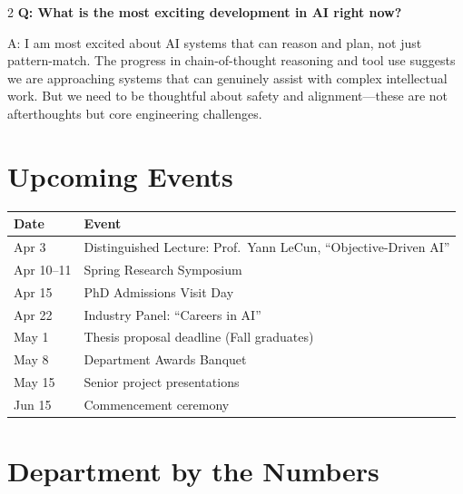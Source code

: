 \documentclass[10pt,a4paper]{article}
\begin{document}
\begin{multicols}{2}
\textbf{Q: What is the most exciting development in AI right now?}

A: I am most excited about AI systems that can reason and plan, not just pattern-match. The progress in chain-of-thought reasoning and tool use suggests we are approaching systems that can genuinely assist with complex intellectual work. But we need to be thoughtful about safety and alignment---these are not afterthoughts but core engineering challenges.

\section{Upcoming Events}

\renewcommand{\arraystretch}{1.3}
\begin{tabularx}{\columnwidth}{@{}lX@{}}
\toprule
\textbf{Date} & \textbf{Event} \\
\midrule
Apr 3 & Distinguished Lecture: Prof.\ Yann LeCun, ``Objective-Driven AI'' \\
Apr 10--11 & Spring Research Symposium \\
Apr 15 & PhD Admissions Visit Day \\
Apr 22 & Industry Panel: ``Careers in AI'' \\
May 1 & Thesis proposal deadline (Fall graduates) \\
May 8 & Department Awards Banquet \\
May 15 & Senior project presentations \\
Jun 15 & Commencement ceremony \\
\bottomrule
\end{tabularx}

\section{Department by the Numbers}

\begin{center}
\end{center}


\end{multicols}
\end{document}
